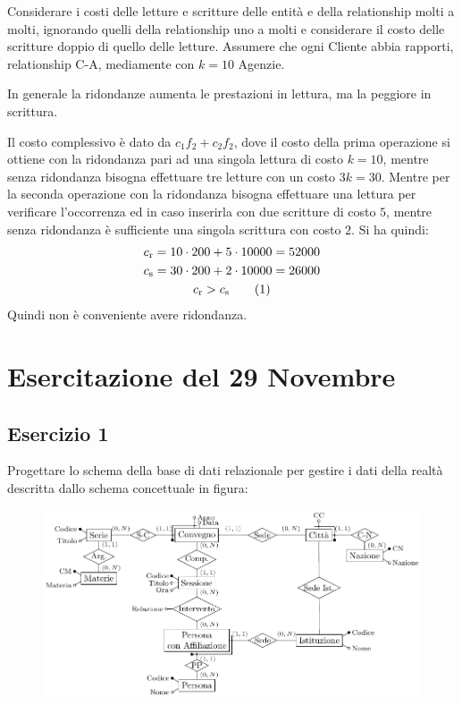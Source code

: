 \documentclass{article}
\numberwithin{equation}{subsection}
\newcommand{\tageq}{\tag{\stepcounter{equation}\theequation}}
\begin{document}
Considerare i costi delle letture e scritture delle entità e della relationship molti a molti, ignorando quelli della relationship uno a molti e 
considerare il costo delle scritture doppio di quello delle letture. Assumere che ogni Cliente abbia rapporti, relationship C-A, mediamente con $k=10$ Agenzie. 

In generale la ridondanze aumenta le prestazioni in lettura, ma la peggiore in scrittura. 

Il costo complessivo è dato da $c_1f_2+c_2f_2$, dove il costo della prima operazione si ottiene con la ridondanza pari ad una singola lettura di 
costo $k=10$, mentre senza ridondanza bisogna effettuare tre letture con un costo $3k=30$. 
Mentre per la seconda operazione con la ridondanza bisogna effettuare una lettura per verificare l'occorrenza ed in caso inserirla con due 
scritture di costo $5$, mentre senza ridondanza è sufficiente una singola scrittura con costo $2$. 
Si ha quindi:
\begin{gather*}
    c_{\mathrm{r}}=10\cdot200+5\cdot10000=52000\\
    c_{\mathrm{s}}=30\cdot200+2\cdot10000=26000\\
    c_{\mathrm{r}}>c_{\mathrm{s}}\tageq
\end{gather*}
Quindi non è conveniente avere ridondanza. 

\clearpage

\section{Esercitazione del 29 Novembre}

\subsection{Esercizio 1}

Progettare lo schema della base di dati relazionale per gestire i dati della realtà descritta dallo schema concettuale in figura:

\begin{figure}[H]%
    \centering%
    \includegraphics{esercizio_1_29-11-24.pdf}%
\end{figure}
\end{document}
